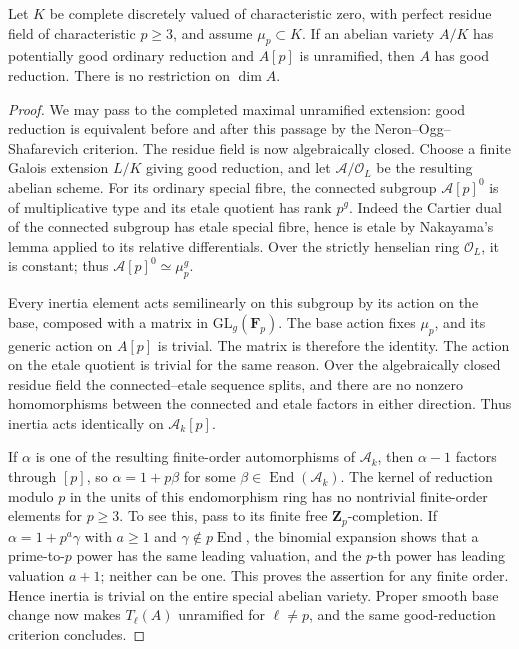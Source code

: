 \begin{proposition}\label{prop:B-RD3}
Let $K$ be complete discretely valued of characteristic zero, with
perfect residue field of characteristic $p\geq3$, and assume
$\mu_p\subset K$. If an abelian variety $A/K$ has potentially good
ordinary reduction and $A[p]$ is unramified, then $A$ has good reduction.
There is no restriction on $\dim A$.
\end{proposition}
\begin{proof}
We may pass to the completed maximal unramified extension: good
reduction is equivalent before and after this passage by the
Neron--Ogg--Shafarevich criterion. The residue field is now algebraically
closed. Choose a finite Galois extension $L/K$ giving good reduction,
and let $\mathcal A/\mathcal O_L$ be the resulting abelian scheme.
For its ordinary special fibre, the connected subgroup
$\mathcal A[p]^0$ is of multiplicative type and its etale quotient has
rank $p^g$. Indeed the Cartier dual of the connected subgroup has
etale special fibre, hence is etale by Nakayama's lemma applied to its
relative differentials. Over the strictly henselian ring
$\mathcal O_L$, it is constant; thus
$\mathcal A[p]^0\simeq\mu_p^g$.

Every inertia element acts semilinearly on this subgroup by its action
on the base, composed with a matrix in $\mathrm{GL}_g(\mathbf F_p)$.
The base action fixes $\mu_p$, and its generic action on $A[p]$ is
trivial. The matrix is therefore the identity. The action on the etale
quotient is trivial for the same reason. Over the algebraically closed
residue field the connected--etale sequence splits, and there are no
nonzero homomorphisms between the connected and etale factors in either
direction. Thus inertia acts identically on $\mathcal A_k[p]$.

If $\alpha$ is one of the resulting finite-order automorphisms of
$\mathcal A_k$, then $\alpha-1$ factors through $[p]$, so
$\alpha=1+p\beta$ for some $\beta\in\operatorname{End}(\mathcal A_k)$.
The kernel of reduction modulo $p$ in the units of this endomorphism
ring has no nontrivial finite-order elements for $p\geq3$. To see this,
pass to its finite free $\mathbf Z_p$-completion. If
$\alpha=1+p^a\gamma$ with $a\geq1$ and $\gamma\notin p\operatorname{End}$,
the binomial expansion shows that a prime-to-$p$ power has the same
leading valuation, and the $p$-th power has leading valuation $a+1$;
neither can be one. This proves the assertion for any finite order.
Hence inertia is trivial on the entire special abelian variety.
Proper smooth base change now makes $T_\ell(A)$ unramified for
$\ell\ne p$, and the same good-reduction criterion concludes.
\end{proof}

